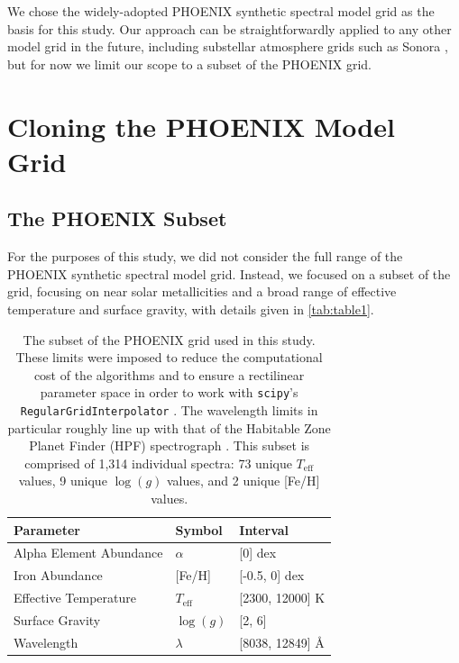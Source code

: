 \documentclass[twocolumn]{aastex631}
\begin{document}
We chose the widely-adopted PHOENIX synthetic spectral model grid \citep{PHOENIX} as the basis for this study.
Our approach can be straightforwardly applied to any other model grid in the future, including substellar atmosphere grids such as Sonora \citep{bobcat, cholla, diamondback, elfowl}, but for now we limit our scope to a subset of the PHOENIX grid.

\section{Cloning the PHOENIX Model Grid}
\subsection{The PHOENIX Subset}
For the purposes of this study, we did not consider the full range of the PHOENIX synthetic spectral model grid. 
Instead, we focused on a subset of the grid, focusing on near solar metallicities and a broad range of effective temperature and surface gravity, with details given in \autoref{tab:table1}.

\begin{table}[h!]
    \centering
    \begin{tabular}{lll}
        \hline
        \bf{Parameter} & \bf{Symbol} & \bf{Interval}\\
        \hline
        Alpha Element Abundance & $\alpha$ & [0] dex\\
        Iron Abundance & [Fe/H] & [-0.5, 0] dex\\
        Effective Temperature & $T_{\mathrm{eff}}$ & [2300, 12000] K\\
        Surface Gravity & $\log(g)$ & [2, 6]\\
        Wavelength & $\lambda$ & [8038, 12849] \AA\\
        \hline
    \end{tabular}
    \caption{The subset of the PHOENIX grid used in this study. 
    These limits were imposed to reduce the computational cost of the algorithms and to ensure a rectilinear parameter space in order to work with \texttt{scipy}'s \texttt{RegularGridInterpolator} \citep{scipy}. 
    The wavelength limits in particular roughly line up with that of the Habitable Zone Planet Finder (HPF) spectrograph \citep{HPF}. 
    This subset is comprised of 1,314 individual spectra: 73 unique $T_{\mathrm{eff}}$ values, 9 unique $\log(g)$ values, and 2 unique [Fe/H] values.}
    \label{tab:table1}
\end{table}
\end{document}
